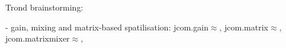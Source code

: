 \documentclass[twoside,a4paper]{article}
\begin{document}
Trond brainstorming:

- gain, mixing and matrix-based spatilisation: jcom.gain$\approx$, jcom.matrix$\approx$, jcom.matrixmixer$\approx$,  





\end{document}
